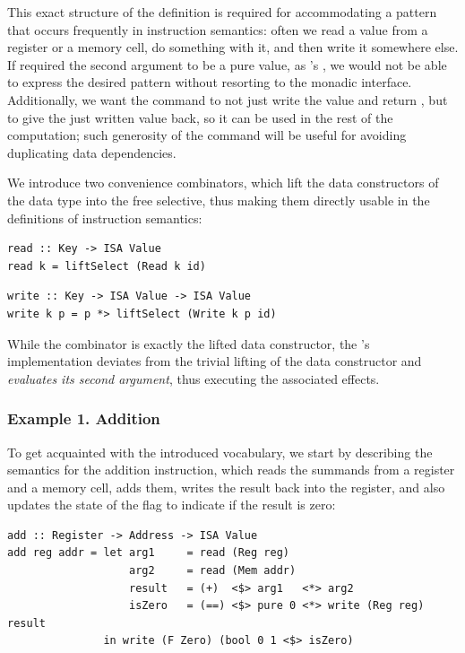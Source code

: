 This exact structure of the definition is required for accommodating a pattern
that occurs frequently in instruction semantics: often we read a value from a
register or a memory cell, do something with it, and then write it somewhere
else. If  required the second argument to be a pure value, as
's , we would not be able to express the desired pattern
without resorting to the monadic interface. Additionally, we want the 
command to not just write the value and return \hs{()}, but to give the just
written value back, so it can be used in the rest of the computation; such
generosity of the  command will be useful for avoiding duplicating
data dependencies.

We introduce two convenience combinators, which lift the data constructors of
the  data type into the free selective, thus making them directly usable
in the definitions of instruction semantics:

\vspace{1mm}
\begin{verbatim}
read :: Key -> ISA Value
read k = liftSelect (Read k id)
\end{verbatim}
\vspace{1mm}
\begin{verbatim}
write :: Key -> ISA Value -> ISA Value
write k p = p *> liftSelect (Write k p id)
\end{verbatim}
\vspace{1mm}

\noindent
While the  combinator is exactly the lifted  data
constructor, the 's implementation deviates from the trivial lifting
of the  data constructor and \emph{evaluates its second argument},
thus executing the associated effects.

\subsubsection{Example 1. Addition}

To get acquainted with the introduced vocabulary, we start by describing the
semantics for the addition instruction, which reads the summands from a
register and a memory cell, adds them, writes the result back into the register,
and also updates the state of the  flag to indicate if the result is
zero:

\vspace{1mm}
\begin{verbatim}
add :: Register -> Address -> ISA Value
add reg addr = let arg1     = read (Reg reg)
                   arg2     = read (Mem addr)
                   result   = (+)  <$> arg1   <*> arg2
                   isZero   = (==) <$> pure 0 <*> write (Reg reg) result
               in write (F Zero) (bool 0 1 <$> isZero)
\end{verbatim}
\vspace{1mm}

